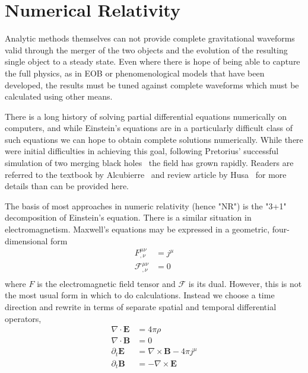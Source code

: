 \section{Numerical Relativity}
\label{sec:NRWaveforms}

Analytic methods themselves can not provide complete gravitational
waveforms valid through the merger of the two objects and the
evolution of the resulting single object to a steady state.  Even
where there is hope of being able to capture the full physics, as in
EOB or phenomenological models that have been developed, the
results must be tuned against complete waveforms which must be
calculated using other means.

There is a long history of solving partial differential equations
numerically on computers, and while Einstein's equations are in a
particularly difficult class of such equations we can hope to obtain
complete solutions numerically.  While there were initial difficulties
in achieving this goal, following Pretorius' successful simulation of
two merging black holes~\cite{Pretorius:2005gq} the field has grown
rapidly.  Readers are referred to the textbook by
Alcubierre~\cite{alcubierreTextbook} and review article by
Husa~\cite{Husa:2007zz} for more details than can be provided here.

The basis of most approaches in numeric relativity (hence "NR") is the
"3+1" decomposition of Einstein's equation.  There is a similar
situation in electromagnetism.  Maxwell's equations may be expressed
in a geometric, four-dimensional form
%
\begin{align*}
F^{\mu\nu}_{,\nu} &= j^\mu \\
\mathcal{F}^{\mu\nu}_{,\nu} &= 0 \\
\end{align*}
%
where $F$ is the electromagnetic field tensor and $\mathcal{F}$ is its dual.
However, this is not the most usual form in which to do calculations.
Instead we choose a time direction and rewrite in terms of separate
spatial and temporal differential operators,
%
\begin{align}
\label{eq:constraints1}
\nabla \cdot \mathbf{E} &= 4\pi \rho \\
\label{eq:constraints2}
\nabla \cdot \mathbf{B} &= 0 \\
\label{eq:evolution1}
\partial_t \mathbf{E}   &= \nabla \times \mathbf{B} - 4\pi j^\mu \\
\label{eq:evolution2}
\partial_t \mathbf{B}   &= - \nabla \times \mathbf{E} \\ \nonumber
\end{align}

